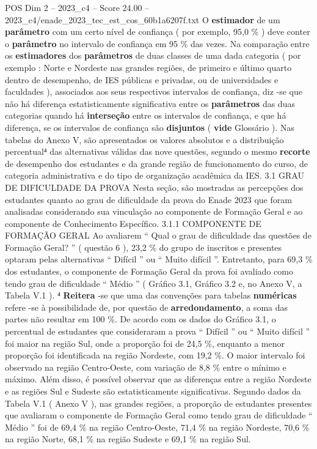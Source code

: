 \begin{textsample}{POS Dim 2 – 2023\_c4 – Score 24.00 – 2023\_c4/enade\_2023\_tec\_est\_cos\_60b1a6207f.txt}
O \textbf{estimador} de um \textbf{parâmetro} com um certo nível de confiança ( por exemplo, 95,0 \% ) deve conter o \textbf{parâmetro} no intervalo de confiança em 95 \% das vezes.
Na comparação entre os \textbf{estimadores} dos \textbf{parâmetros} de duas classes de uma dada categoria ( por exemplo : Norte e Nordeste nas grandes regiões, de primeiro e último quarto dentro de desempenho, de IES públicas e privadas, ou de universidades e faculdades ), associados aos seus respectivos intervalos de confiança, diz -se que não há diferença estatisticamente significativa entre os \textbf{parâmetros} das duas categorias quando há \textbf{interseção} entre os intervalos de confiança, e que há diferença, se os intervalos de confiança são \textbf{disjuntos} ( \textbf{vide} Glossário ).
Nas tabelas do Anexo V, são apresentados os valores absolutos e a distribuição percentual⁴ das alternativas válidas das nove questões, segundo o mesmo \textbf{recorte} de desempenho dos estudantes e da grande região de funcionamento do curso, de categoria administrativa e do tipo de organização acadêmica da IES. 3.1 GRAU DE DIFICULDADE DA PROVA Nesta seção, são mostradas as percepções dos estudantes quanto ao grau de dificuldade da prova do Enade 2023 que foram analisadas considerando sua vinculação ao componente de Formação Geral e ao componente de Conhecimento Específico. 3.1.1 COMPONENTE DE FORMAÇÃO GERAL Ao avaliarem “ Qual o grau de dificuldade das questões de Formação Geral? ” ( questão 6 ), 23,2 \% do grupo de inscritos e presentes optaram pelas alternativas “ Difícil ” ou “ Muito difícil ”.
Entretanto, para 69,3 \% dos estudantes, o componente de Formação Geral da prova foi avaliado como tendo grau de dificuldade “ Médio ” ( Gráfico 3.1, Gráfico 3.2 e, no Anexo V, a Tabela V.1 ). ⁴ \textbf{Reitera} -se que uma das convenções para tabelas \textbf{numéricas} refere -se à possibilidade de, por questão de \textbf{arredondamento}, a soma das partes não resultar em 100 \%.
De acordo com os dados do Gráfico 3.1, o percentual de estudantes que consideraram a prova “ Difícil ” ou “ Muito difícil ” foi maior na região Sul, onde a proporção foi de 24,5 \%, enquanto a menor proporção foi identificada na região Nordeste, com 19,2 \%.
O maior intervalo foi observado na região Centro-Oeste, com variação de 8,8 \% entre o mínimo e máximo.
Além disso, é possível observar que as diferenças entre a região Nordeste e as regiões Sul e Sudeste são estatisticamente significativas.
Segundo dados da Tabela V.1 ( Anexo V ), nas grandes regiões, a proporção de estudantes presentes que avaliaram o componente de Formação Geral como tendo grau de dificuldade “ Médio ” foi de 69,4 \% na região Centro-Oeste, 71,4 \% na região Nordeste, 70,6 \% na região Norte, 68,1 \% na região Sudeste e 69,1 \% na região Sul.

\end{textsample}
